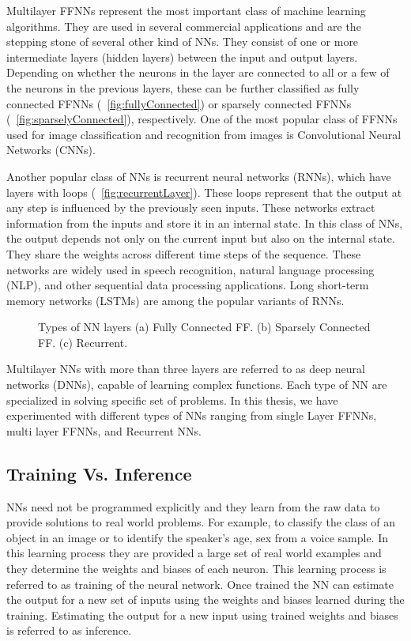 Multilayer FFNNs represent the most important class of machine learning algorithms. They are used in several commercial applications and are the stepping stone of several other kind of NNs. They consist of one or more intermediate layers (hidden layers) between the input and output layers. Depending on whether the neurons in the layer are connected to all or a few of the neurons in the previous layers, these can be further classified as fully connected FFNNs (\figurename{~\ref{fig:fullyConnected}}) or sparsely connected FFNNs (\figurename{~\ref{fig:sparselyConnected}}), respectively. One of the most popular class of FFNNs used for image classification and recognition from images is Convolutional Neural Networks (CNNs).

Another popular class of NNs is recurrent neural networks (RNNs), which have layers with loops (\figurename{~\ref{fig:recurrentLayer}}). These loops represent that the output at any step is influenced by the previously seen inputs. These networks extract information from the inputs and store it in an internal state. In this class of NNs, the output depends not only on the current input but also on the internal state. They share the weights across different time steps of the sequence. These networks are widely used in speech recognition, natural language processing (NLP), and other sequential data processing applications. Long short-term memory networks (LSTMs) are among the popular variants of RNNs.

\begin{figure}[!htb]
	\centering
	\captionsetup{font=sf}
	\hfil
	\hfil
	\caption{Types of NN layers (a) Fully Connected FF. (b) Sparsely Connected FF. (c) Recurrent. }
	\label{fig:nnLayers}
\end{figure}
Multilayer NNs with more than three layers are referred to as deep neural networks (DNNs), capable of learning complex functions. Each type of NN are specialized in solving specific set of problems. In this thesis, we have experimented with different types of NNs ranging from single Layer FFNNs, multi layer FFNNs, and Recurrent NNs.
  
\subsection{Training Vs. Inference}
NNs need not be programmed explicitly and they learn from the raw data to provide solutions to real world problems. For example, to classify the class of an object in an image or to identify the speaker's age, sex from a voice sample. In this learning process they are provided a large set of real world examples and they determine the weights and biases of each neuron. This learning process is referred to as training of the neural network. Once trained the NN can estimate the output for a new set of inputs using the weights and biases learned during the training. Estimating the output for a new input using trained weights and biases is referred to as inference.

